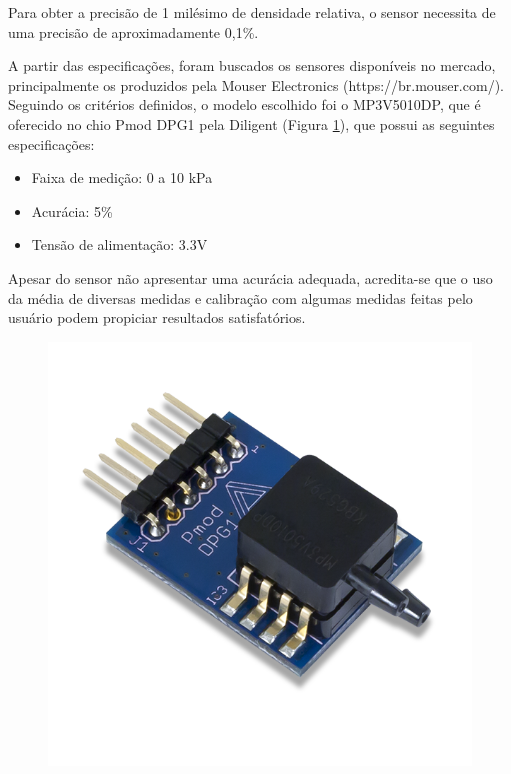 Para obter a precisão de 1 milésimo de densidade relativa, o sensor necessita de uma precisão de aproximadamente 0,1\%.


A partir das especificações, foram buscados os sensores disponíveis no mercado, principalmente os produzidos pela Mouser Electronics (https://br.mouser.com/). Seguindo os critérios definidos, o modelo escolhido foi o MP3V5010DP, que é oferecido no chio Pmod DPG1 pela Diligent (Figura \ref{fig:Pmod_DPG1}), que possui as seguintes especificações:

\begin{itemize}
\item Faixa de medição: 0 a 10 kPa
\item Acurácia: 5\%
\item Tensão de alimentação: 3.3V
\end{itemize}

Apesar do sensor não apresentar uma acurácia adequada, acredita-se que o uso da média de diversas medidas e calibração com algumas medidas feitas pelo usuário podem propiciar resultados satisfatórios.

\begin{figure}[h]
    \centering
    \includegraphics[scale=0.30]{figuras/projeto/hardware/DPG1.png}
    \label{fig:Pmod_DPG1}
\end{figure}


